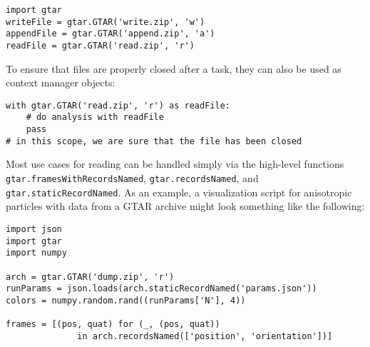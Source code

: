 \documentclass{article}
\begin{document}
\begin{verbatim}
import gtar
writeFile = gtar.GTAR('write.zip', 'w')
appendFile = gtar.GTAR('append.zip', 'a')
readFile = gtar.GTAR('read.zip', 'r')
\end{verbatim}

To ensure that files are properly closed after a task, they can also be used as context manager objects:

\begin{verbatim}
with gtar.GTAR('read.zip', 'r') as readFile:
    # do analysis with readFile
    pass
# in this scope, we are sure that the file has been closed
\end{verbatim}

Most use cases for reading can be handled simply via the high-level functions \texttt{gtar.framesWithRecordsNamed}, \texttt{gtar.recordsNamed}, and \texttt{gtar.staticRecordNamed}.
As an example, a visualization script for anisotropic particles with data from a GTAR archive might look something like the following:

\begin{verbatim}
import json
import gtar
import numpy

arch = gtar.GTAR('dump.zip', 'r')
runParams = json.loads(arch.staticRecordNamed('params.json'))
colors = numpy.random.rand((runParams['N'], 4))

frames = [(pos, quat) for (_, (pos, quat))
              in arch.recordsNamed(['position', 'orientation'])]
\end{verbatim}
\end{document}
